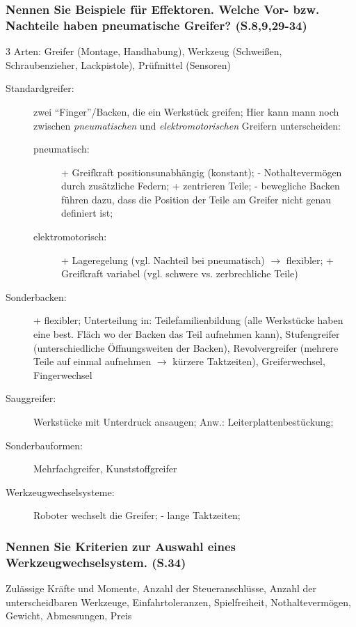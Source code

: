 \documentclass[12pt,a4paper,titlepage,oneside]{article}
\begin{document}
\subsubsection*{Nennen Sie Beispiele für Effektoren. Welche Vor- bzw. Nachteile haben pneumatische 
Greifer? (S.8,9,29-34)}
3 Arten: Greifer (Montage, Handhabung), Werkzeug (Schweißen, Schraubenzieher, Lackpistole), 
Prüfmittel (Sensoren)
\begin{description}
\item[Standardgreifer:] zwei ``Finger''/Backen, die ein Werkstück greifen; Hier kann mann noch
  zwischen \emph{pneumatischen} und \emph{elektromotorischen} Greifern unterscheiden:
  \begin{description}
    \item[pneumatisch:] + Greifkraft positionsunabhängig (konstant); - Nothaltevermögen durch
      zusätzliche Federn; + zentrieren Teile; - bewegliche Backen führen dazu, dass die 
      Position der Teile am Greifer nicht genau definiert ist;
    \item[elektromotorisch:] + Lageregelung (vgl. Nachteil bei pneumatisch) $\rightarrow$ 
      flexibler; + Greifkraft variabel (vgl. schwere vs. zerbrechliche Teile)
  \end{description}
\item[Sonderbacken:] + flexibler; Unterteilung in: Teilefamilienbildung (alle Werkstücke haben 
  eine best. Fläch wo der Backen das Teil aufnehmen kann), Stufengreifer (unterschiedliche
  Öffnungsweiten der Backen), Revolvergreifer (mehrere Teile auf einmal aufnehmen 
  $\rightarrow$ kürzere Taktzeiten), Greiferwechsel, Fingerwechsel
\item[Sauggreifer:] Werkstücke mit Unterdruck ansaugen; Anw.: Leiterplattenbestückung;
\item[Sonderbauformen:] Mehrfachgreifer, Kunststoffgreifer
\item[Werkzeugwechselsysteme:] Roboter wechselt die Greifer; - lange Taktzeiten;
\end{description}

\subsubsection*{Nennen Sie Kriterien zur Auswahl eines Werkzeugwechselsystem. (S.34)}
Zulässige Kräfte und Momente, Anzahl der Steueranschlüsse, Anzahl der unterscheidbaren 
Werkzeuge, Einfahrtoleranzen, Spielfreiheit, Nothaltevermögen, Gewicht, Abmessungen, Preis
\end{document}
